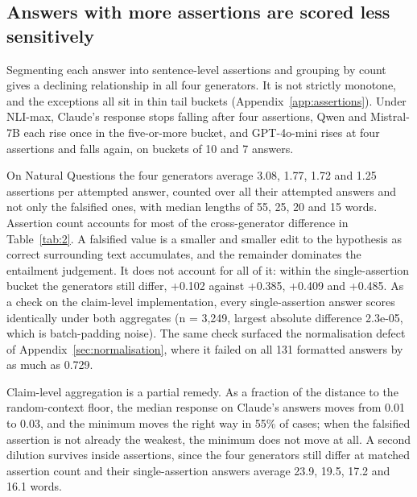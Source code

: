 \documentclass[11pt]{article}
\newcommand{\movableblock}[1]{}             %
\newcommand{\movedref}{Appendix}            %
\newcommand{\movableblock}[1]{}
\newcommand{\movedref}{Section}
\begin{document}
\movableblock{sections/entity}

\movableblock{sections/copying}

\subsection{Answers with more assertions are scored less sensitively}
\label{sec:assertions}

Segmenting each answer into sentence-level assertions and grouping by count gives a declining relationship in all four generators. It is not strictly monotone, and the exceptions all sit in thin tail buckets (Appendix~\ref{app:assertions}). Under NLI-max, Claude's response stops falling after four assertions, Qwen and Mistral-7B each rise once in the five-or-more bucket, and GPT-4o-mini rises at four assertions and falls again, on buckets of 10 and 7 answers.

On Natural Questions the four generators average 3.08, 1.77, 1.72 and 1.25 assertions per attempted answer, counted over all their attempted answers and not only the falsified ones, with median lengths of 55, 25, 20 and 15 words. Assertion count accounts for most of the cross-generator difference in Table~\ref{tab:2}. A falsified value is a smaller and smaller edit to the hypothesis as correct surrounding text accumulates, and the remainder dominates the entailment judgement. It does not account for all of it: within the single-assertion bucket the generators still differ, +0.102 against +0.385, +0.409 and +0.485. As a check on the claim-level implementation, every single-assertion answer scores identically under both aggregates (n = 3,249, largest absolute difference 2.3e-05, which is batch-padding noise). The same check surfaced the normalisation defect of \movedref~\ref{sec:normalisation}, where it failed on all 131 formatted answers by as much as 0.729.

Claim-level aggregation is a partial remedy. As a fraction of the distance to the random-context floor, the median response on Claude's answers moves from 0.01 to 0.03, and the minimum moves the right way in 55\% of cases; when the falsified assertion is not already the weakest, the minimum does not move at all. A second dilution survives inside assertions, since the four generators still differ at matched assertion count and their single-assertion answers average 23.9, 19.5, 17.2 and 16.1 words.
\end{document}
